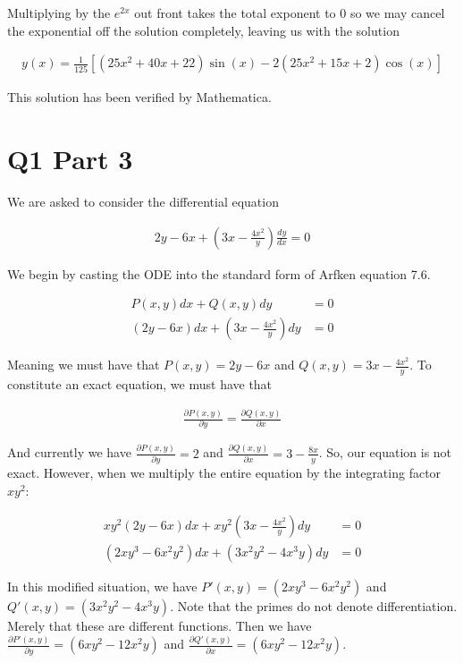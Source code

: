 \documentclass[paper=a4, fontsize=11pt]{scrartcl} %
\numberwithin{equation}{section} %
\numberwithin{figure}{section} %
\numberwithin{table}{section} %
\begin{document}
Multiplying by the $e^{2x}$ out front takes the total exponent to $0$ so we may cancel the exponential off the solution completely, leaving us with the solution

\begin{align}
y(x) =  \frac{1}{125} \left[\left(25 x^2+40 x+22\right) \sin(x) -2 \left(25 x^2+15 x+2\right) \cos(x) \right]
\end{align}  

This solution has been verified by Mathematica. \checkmark

\section{Q1 Part 3}

We are asked to consider the differential equation

\begin{align}
2y - 6x + \left(3x - \frac{4 x^2}{y}\right)\frac{dy}{dx} = 0
\end{align}

We begin by casting the ODE into the standard form of Arfken equation 7.6.

\begin{align}
P(x,y)dx + Q(x,y)dy &= 0 \\ 
(2y - 6x)dx + \left(3x - \frac{4x^2}{y}\right)dy &= 0
\end{align}

Meaning we must have that $P(x,y) = 2y - 6x$ and $Q(x,y) = 3x - \frac{4x^2}{y}$. To constitute an exact equation, we must have that 

\begin{align}
\frac{\partial P(x,y)}{\partial y} = \frac{\partial Q(x,y)}{\partial x}
\end{align} 

And currently we have $\frac{\partial P(x,y)}{\partial y} = 2$ and $\frac{\partial Q(x,y)}{\partial x} = 3 - \frac{8x}{y}$. So, our equation is not exact. However, when we multiply the entire equation by the integrating factor $xy^2$: 

\begin{align}
x y^2 (2y - 6x)dx + x y^2 \left(3x - \frac{4x^2}{y}\right)dy &= 0 \\
(2 x y^3 - 6 x^2 y^2)dx + \left(3 x^2 y^2 - 4 x^3 y \right)dy &= 0
\end{align}

In this modified situation, we have $P'(x,y) = (2xy^3 - 6x^2y^2)$ and $Q'(x,y) = (3x^2 y^2 - 4 x^3 y)$. Note that the primes do not denote differentiation. Merely that these are different functions. Then we have $\frac{\partial P'(x,y)}{\partial y} = (6 x y^2 - 12 x^2 y)$ and  $\frac{\partial Q'(x,y)}{\partial x} = (6 x y^2 - 12 x^2 y)$. \checkmark
\end{document}
